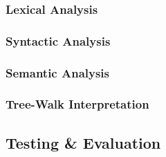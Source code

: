 \subsubsection{Lexical Analysis}

\subsubsection{Syntactic Analysis} 

\subsubsection{Semantic Analysis} 

\subsubsection{Tree-Walk Interpretation} 

% 

\subsection{Testing \& Evaluation}

%






